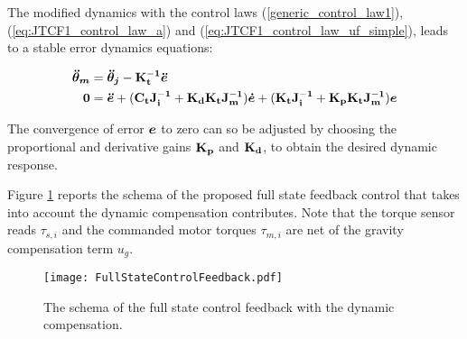 	The modified dynamics with the control laws  (\ref{generic_control_law1}), (\ref{eq:JTCF1_control_law_a}) and (\ref{eq:JTCF1_control_law_uf_simple}), leads to a stable error dynamics equations:
	
	\begin{align}
	{ \boldsymbol {\ddot{\theta}_m}} &= { \boldsymbol {\ddot{\theta}_j}} -\mathbf{K_t^{-1}} { \boldsymbol {\ddot{e}}}
\\
	{ \boldsymbol {0}} & = { \boldsymbol {\ddot{e}}} + ( \mathbf{C_t} \mathbf{J_i^{-1}} + \mathbf{K_d} \mathbf{K_t}  \mathbf{J_m^{-1}}){ \boldsymbol {\dot{e}}}+ ( \mathbf{K_t} \mathbf{J_i^{-1}}  + \mathbf{K_p}  \mathbf{K_t}  \mathbf{J_m^{-1}}){ \boldsymbol {e}}
	\end{align}
	
	The convergence of error ${ \boldsymbol {e}}$ to zero can so be adjusted by choosing the proportional and derivative gains $\mathbf{K_p}$ and $\mathbf{K_d}$, to obtain the desired dynamic response.
	
	\par Figure \ref{fig:full state} reports the schema of the proposed full state feedback control that takes into account the dynamic compensation contributes. Note that the torque sensor reads $\tau_{s,i}$ and the commanded motor torques  $\tau_{m,i}$ are net of the gravity compensation term $u_g$.
	
	\begin{figure}[]
		\centering
		\texttt{[image: FullStateControlFeedback.pdf]}
		\caption{The schema of the full state control feedback with the dynamic compensation.}
		\label{fig:full state}
	\end{figure}
	
